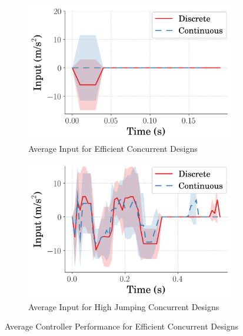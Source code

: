 %  
\begin{figure}[tb!]
  \centering
  \begin{subfigure}{.49\textwidth}
    \centering
    \includegraphics[width=\textwidth]{figures/Ch5/dis_vs_cont/avg_eff_Input_.png}  
    \caption{Average Input for Efficient Concurrent Designs}
    \label{fig:disc_vs_cont_input_eff}
  \end{subfigure}%
  \hfill
  \begin{subfigure}{.49\textwidth}
    \centering
    \includegraphics[width=\textwidth]{figures/Ch5/dis_vs_cont/avg_hei_Input_.png}  
    \caption{Average Input for High Jumping Concurrent Designs}
    \label{fig:disc_vs_cont_input_hei}
  \end{subfigure}%
   \caption{Average Controller Performance for Efficient Concurrent Designs}
   \label{fig:disc_vs_cont_input}
\end{figure}
% 

